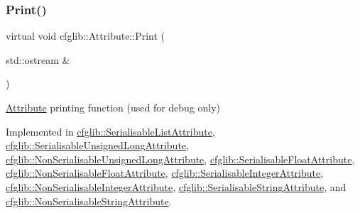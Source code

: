 \mbox{\label{classcfglib_1_1Attribute_af8d87ceddde146b92727e61823e0129b}} 
\subsubsection{\texorpdfstring{Print()}{Print()}}
{\footnotesize\ttfamily virtual void cfglib\+::\+Attribute\+::\+Print (\begin{DoxyParamCaption}\item[{std\+::ostream \&}]{ }\end{DoxyParamCaption})\hspace{0.3cm}{\ttfamily [pure virtual]}}

\hyperlink{classcfglib_1_1Attribute}{Attribute} printing function (used for debug only) 

Implemented in \hyperlink{classcfglib_1_1SerialisableListAttribute_a3a76c800c9ebcd084b64c1c5f049caf5}{cfglib\+::\+Serialisable\+List\+Attribute}, \hyperlink{classcfglib_1_1SerialisableUnsignedLongAttribute_a4d53682ce58f689045c6f55a04e1c6cd}{cfglib\+::\+Serialisable\+Unsigned\+Long\+Attribute}, \hyperlink{classcfglib_1_1NonSerialisableUnsignedLongAttribute_aef0e4a5bc60b6d4f278ab2daa553f598}{cfglib\+::\+Non\+Serialisable\+Unsigned\+Long\+Attribute}, \hyperlink{classcfglib_1_1SerialisableFloatAttribute_af36f296204e1a8547f3fbef7ec4c23da}{cfglib\+::\+Serialisable\+Float\+Attribute}, \hyperlink{classcfglib_1_1NonSerialisableFloatAttribute_a507fc8e93b9ff7c56d483f2e51634e67}{cfglib\+::\+Non\+Serialisable\+Float\+Attribute}, \hyperlink{classcfglib_1_1SerialisableIntegerAttribute_ad2f90817bfc2f4aa2f5be3064e19e11a}{cfglib\+::\+Serialisable\+Integer\+Attribute}, \hyperlink{classcfglib_1_1NonSerialisableIntegerAttribute_ade6c5738723b606295a2cf14fe568247}{cfglib\+::\+Non\+Serialisable\+Integer\+Attribute}, \hyperlink{classcfglib_1_1SerialisableStringAttribute_a7149bb6d92d50db794bde6867cef4550}{cfglib\+::\+Serialisable\+String\+Attribute}, and \hyperlink{classcfglib_1_1NonSerialisableStringAttribute_aedeb7ccd57b84ed2e3bcfc464038682e}{cfglib\+::\+Non\+Serialisable\+String\+Attribute}.

\mbox{\label{classcfglib_1_1Attribute_ae6e91c4069d2d54d264e25511e81d962}} 
